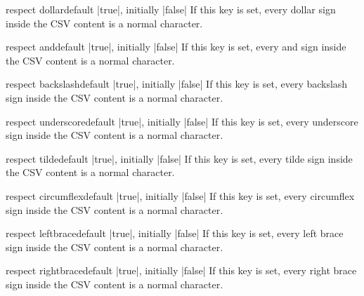 \documentclass[a4paper,11pt]{ltxdoc}
\begin{document}
\begin{docCsvKey}{respect dollar}{}{default |true|, initially |false|}
  If this key is set, every
  dollar sign \verbbox{\$}
  inside the CSV content is a normal character.
\end{docCsvKey}

\begin{docCsvKey}{respect and}{}{default |true|, initially |false|}
  If this key is set, every
  and sign \verbbox{\&}
  inside the CSV content is a normal character.
\end{docCsvKey}

\begin{docCsvKey}{respect backslash}{}{default |true|, initially |false|}
  If this key is set, every
  backslash sign \verbbox{\textbackslash}
  inside the CSV content is a normal character.
\end{docCsvKey}

\begin{docCsvKey}{respect underscore}{}{default |true|, initially |false|}
  If this key is set, every
  underscore sign \verbbox{\_}
  inside the CSV content is a normal character.
\end{docCsvKey}

\begin{docCsvKey}{respect tilde}{}{default |true|, initially |false|}
  If this key is set, every
  tilde sign \verbbox{\textasciitilde}
  inside the CSV content is a normal character.
\end{docCsvKey}

\begin{docCsvKey}{respect circumflex}{}{default |true|, initially |false|}
  If this key is set, every
  circumflex sign \verbbox{\textasciicircum}
  inside the CSV content is a normal character.
\end{docCsvKey}

\begin{docCsvKey}{respect leftbrace}{}{default |true|, initially |false|}
  If this key is set, every
  left brace sign \verbbox{\textbraceleft}
  inside the CSV content is a normal character.
\end{docCsvKey}

\begin{docCsvKey}{respect rightbrace}{}{default |true|, initially |false|}
  If this key is set, every
  right brace sign \verbbox{\textbraceright}
  inside the CSV content is a normal character.
\end{docCsvKey}
\end{document}
